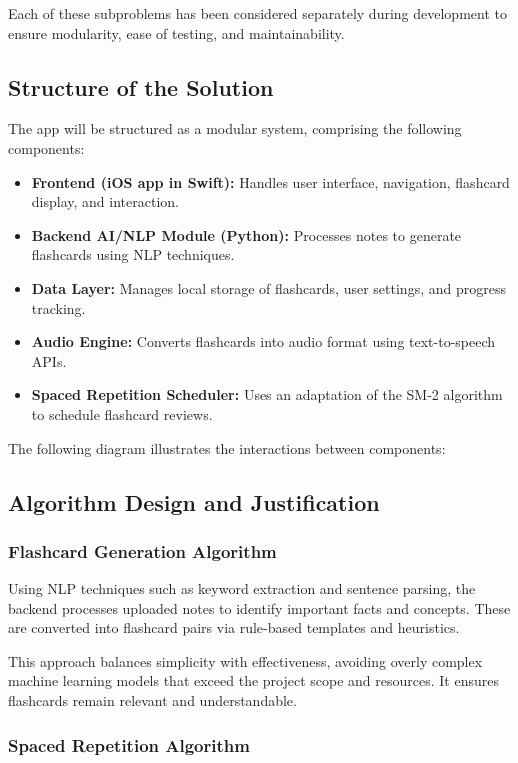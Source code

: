 \documentclass[a4paper,12pt]{article}
\begin{document}
Each of these subproblems has been considered separately during development to ensure modularity, ease of testing, and maintainability.

\subsection{Structure of the Solution}

The app will be structured as a modular system, comprising the following components:

\begin{itemize}
  \item \textbf{Frontend (iOS app in Swift):} Handles user interface, navigation, flashcard display, and interaction.
  \item \textbf{Backend AI/NLP Module (Python):} Processes notes to generate flashcards using NLP techniques.
  \item \textbf{Data Layer:} Manages local storage of flashcards, user settings, and progress tracking.
  \item \textbf{Audio Engine:} Converts flashcards into audio format using text-to-speech APIs.
  \item \textbf{Spaced Repetition Scheduler:} Uses an adaptation of the SM-2 algorithm to schedule flashcard reviews.
\end{itemize}

The following diagram illustrates the interactions between components:

\subsection{Algorithm Design and Justification}

\subsubsection*{Flashcard Generation Algorithm}

Using NLP techniques such as keyword extraction and sentence parsing, the backend processes uploaded notes to identify important facts and concepts. These are converted into flashcard pairs via rule-based templates and heuristics.

This approach balances simplicity with effectiveness, avoiding overly complex machine learning models that exceed the project scope and resources. It ensures flashcards remain relevant and understandable.

\subsubsection*{Spaced Repetition Algorithm}
\end{document}
